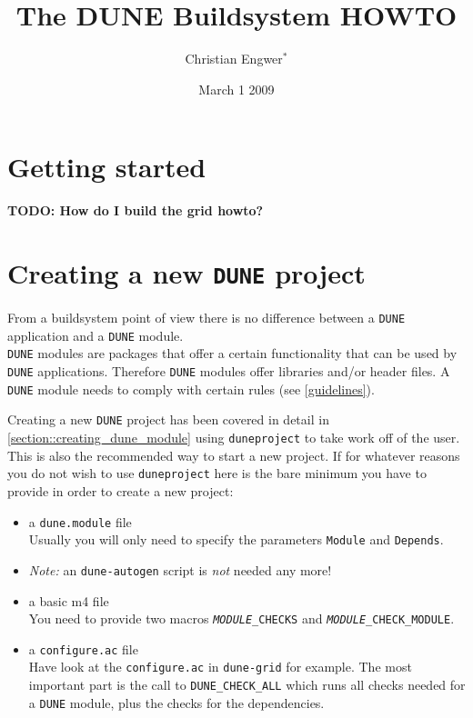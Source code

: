 \documentclass[11pt,a4paper,headinclude,footinclude,DIV16,normalheadings]{scrartcl}
\title{The DUNE Buildsystem HOWTO}
\author{Christian Engwer$^\ast$ 
}
\date{March 1 2009}
\newcommand{\dune}{\texttt{DUNE}\xspace}
\newcommand{\autogen}{\texttt{dune-autogen}\xspace}
\newcommand{\configureac}{\texttt{configure.ac}\xspace}
\newcommand{\dunegrid}{\texttt{dune-grid}\xspace}
\newcommand{\duneproject}{\texttt{duneproject}\xspace}
\newcommand{\dunemodule}{\texttt{dune.module}\xspace}
\begin{document}
\maketitle
\tableofcontents
\pagebreak

\section{Getting started}\label{section::getting_started}

\textbf{TODO: How do I build the grid howto?}

\section{Creating a new \dune project}\label{section::creating_new_dune_project}

From a buildsystem point of view there is no difference between a \dune
application and a \dune module.\\

\dune modules are packages that offer a certain functionality that can
be used by \dune applications. Therefore \dune modules offer libraries
and/or header files. A \dune module needs to comply with certain rules
(see \ref{guidelines}).

Creating a new \dune project has been covered in detail in 
\ref{section::creating_dune_module} using \texttt{duneproject} to take
work off of the user. This is also the recommended way to start a new project. 
If for whatever reasons you do not wish to use \duneproject here is 
the bare minimum you have to provide in order to create a new project:
\begin{itemize}
\item a \dunemodule file\\
  Usually you will only need to specify the parameters \texttt{Module}
  and \texttt{Depends}.
\item \emph{Note:} an \autogen script is \emph{not} needed any more!
\item a basic m4 file\\
  You need to provide two macros \texttt{\emph{MODULE}\_CHECKS}
  and \texttt{\emph{MODULE}\_CHECK\_MODULE}.
\item a \configureac file\\
  Have look at the \configureac in \dunegrid for example. The most
  important part is the call to \texttt{DUNE\_CHECK\_ALL} which
  runs all checks needed for a \dune module, plus the checks for the
  dependencies.
\end{itemize}
\end{document}

